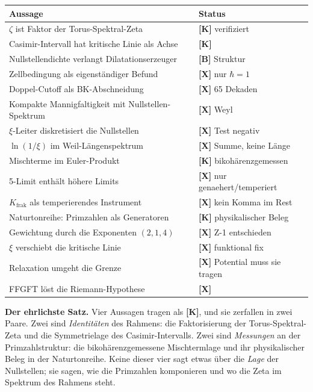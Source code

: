 \begin{center}
\begin{tabular}{ll}
\toprule
Aussage & Status \\
\midrule
$\zeta$ ist Faktor der Torus-Spektral-Zeta & \textbf{[K]} verifiziert \\
Casimir-Intervall hat kritische Linie als Achse & \textbf{[K]} \\
Nullstellendichte verlangt Dilatationserzeuger & \textbf{[B]} Struktur \\
Zellbedingung als eigenst\"andiger Befund & \textbf{[X]} nur $\hbar = 1$ \\
Doppel-Cutoff als BK-Abschneidung & \textbf{[X]} 65 Dekaden \\
Kompakte Mannigfaltigkeit mit Nullstellen-Spektrum & \textbf{[X]} Weyl \\
$\xi$-Leiter diskretisiert die Nullstellen & \textbf{[X]} Test negativ \\
$\ln(1/\xi)$ im Weil-L\"angenspektrum & \textbf{[X]} Summe, keine L\"ange \\
Mischterme im Euler-Produkt & \textbf{[K]} bikoh\"arenzgemessen \\
5-Limit enth\"alt h\"ohere Limits & \textbf{[X]} nur genaehert/temperiert \\
$K_\text{frak}$ als temperierendes Instrument & \textbf{[X]} kein Komma im Rest \\
Naturtonreihe: Primzahlen als Generatoren & \textbf{[K]} physikalischer Beleg \\
Gewichtung durch die Exponenten $(2,1,4)$ & \textbf{[X]} Z-1 entschieden \\
$\xi$ verschiebt die kritische Linie & \textbf{[X]} funktional fix \\
Relaxation umgeht die Grenze & \textbf{[X]} Potential muss sie tragen \\
FFGFT l\"ost die Riemann-Hypothese & \textbf{[X]} \\
\bottomrule
\end{tabular}
\end{center}

\textbf{Der ehrlichste Satz.} Vier Aussagen tragen als \textbf{[K]},
und sie zerfallen in zwei Paare. Zwei sind \emph{Identit\"aten} des
Rahmens: die Faktorisierung der Torus-Spektral-Zeta und die
Symmetrielage des Casimir-Intervalls. Zwei sind \emph{Messungen} an der
Primzahlstruktur: die bikoh\"arenzgemessene Mischtermlage und ihr
physikalischer Beleg in der Naturtonreihe. Keine dieser vier sagt etwas
\"uber die \emph{Lage} der Nullstellen; sie sagen, wie die Primzahlen
komponieren und wo die Zeta im Spektrum des Rahmens steht.

